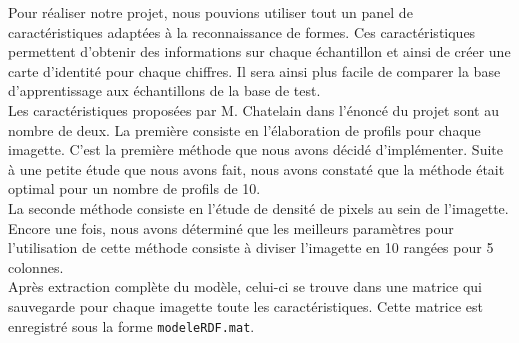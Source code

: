 Pour réaliser notre projet, nous pouvions utiliser tout un panel
de caractéristiques adaptées à la reconnaissance de formes. Ces 
caractéristiques permettent d'obtenir des informations sur chaque
échantillon et ainsi de créer une \og carte d'identité \fg pour
chaque chiffres. Il sera ainsi plus facile de comparer la base
d'apprentissage aux échantillons de la base de test. \\
Les caractéristiques proposées par M. Chatelain dans l'énoncé du
projet sont au nombre de deux. La première consiste en l'élaboration
de profils pour chaque imagette. C'est la première méthode que
nous avons décidé d'implémenter. Suite à une petite étude que nous
avons fait, nous avons constaté que la méthode était optimal pour un
nombre de profils de 10. \\
La seconde méthode consiste en l'étude de densité de pixels au sein de 
l'imagette. Encore une fois, nous avons déterminé que les meilleurs
paramètres pour l'utilisation de cette méthode consiste à diviser 
l'imagette en 10 rangées pour 5 colonnes. \\
Après extraction complète du modèle, celui-ci se trouve dans une 
matrice qui sauvegarde pour chaque imagette toute les caractéristiques.
Cette matrice est enregistré sous la forme \texttt{modeleRDF.mat}.